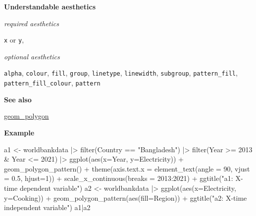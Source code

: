 \documentclass[
  letterpaper,
  DIV=11,
  numbers=noendperiod]{scrreprt}
\newenvironment{Shaded}{\begin{snugshade}}{\end{snugshade}}
\newcommand{\AttributeTok}[1]{\textcolor[rgb]{0.40,0.45,0.13}{#1}}
\newcommand{\DecValTok}[1]{\textcolor[rgb]{0.68,0.00,0.00}{#1}}
\newcommand{\FloatTok}[1]{\textcolor[rgb]{0.68,0.00,0.00}{#1}}
\newcommand{\FunctionTok}[1]{\textcolor[rgb]{0.28,0.35,0.67}{#1}}
\newcommand{\NormalTok}[1]{\textcolor[rgb]{0.00,0.23,0.31}{#1}}
\newcommand{\OtherTok}[1]{\textcolor[rgb]{0.00,0.23,0.31}{#1}}
\newcommand{\SpecialCharTok}[1]{\textcolor[rgb]{0.37,0.37,0.37}{#1}}
\newcommand{\StringTok}[1]{\textcolor[rgb]{0.13,0.47,0.30}{#1}}
\begin{document}
\textbf{Understandable aesthetics}

\emph{required aesthetics}

\texttt{x} or \texttt{y},

\emph{optional aesthetics}

\texttt{alpha}, \texttt{colour}, \texttt{fill}, \texttt{group},
\texttt{linetype}, \texttt{linewidth}, \texttt{subgroup},
\texttt{pattern\_fill}, \texttt{pattern\_fill\_colour}, \texttt{pattern}

\textbf{See also}

\hyperref[polygon]{geom\_polygon}

\textbf{Example}

\begin{Shaded}
\begin{Highlighting}[]
\NormalTok{a1 }\OtherTok{\textless{}{-}}\NormalTok{ worldbankdata }\SpecialCharTok{|\textgreater{}}
  \FunctionTok{filter}\NormalTok{(Country }\SpecialCharTok{==} \StringTok{"Bangladesh"}\NormalTok{) }\SpecialCharTok{|\textgreater{}} 
  \FunctionTok{filter}\NormalTok{(Year }\SpecialCharTok{\textgreater{}=} \DecValTok{2013} \SpecialCharTok{\&}\NormalTok{ Year }\SpecialCharTok{\textless{}=} \DecValTok{2021}\NormalTok{) }\SpecialCharTok{|\textgreater{}}
  \FunctionTok{ggplot}\NormalTok{(}\FunctionTok{aes}\NormalTok{(}\AttributeTok{x=}\NormalTok{Year, }\AttributeTok{y=}\NormalTok{Electricity)) }\SpecialCharTok{+} 
  \FunctionTok{geom\_polygon\_pattern}\NormalTok{() }\SpecialCharTok{+}
  \FunctionTok{theme}\NormalTok{(}\AttributeTok{axis.text.x =} \FunctionTok{element\_text}\NormalTok{(}\AttributeTok{angle =} \DecValTok{90}\NormalTok{, }\AttributeTok{vjust =} \FloatTok{0.5}\NormalTok{, }\AttributeTok{hjust=}\DecValTok{1}\NormalTok{)) }\SpecialCharTok{+} 
  \FunctionTok{scale\_x\_continuous}\NormalTok{(}\AttributeTok{breaks =} \DecValTok{2013}\SpecialCharTok{:}\DecValTok{2021}\NormalTok{)  }\SpecialCharTok{+} 
  \FunctionTok{ggtitle}\NormalTok{(}\StringTok{"a1: X{-}time dependent variable"}\NormalTok{)}
\NormalTok{a2 }\OtherTok{\textless{}{-}}\NormalTok{ worldbankdata }\SpecialCharTok{|\textgreater{}}
  \FunctionTok{ggplot}\NormalTok{(}\FunctionTok{aes}\NormalTok{(}\AttributeTok{x=}\NormalTok{Electricity, }\AttributeTok{y=}\NormalTok{Cooking)) }\SpecialCharTok{+} 
  \FunctionTok{geom\_polygon\_pattern}\NormalTok{(}\FunctionTok{aes}\NormalTok{(}\AttributeTok{fill=}\NormalTok{Region)) }\SpecialCharTok{+} 
  \FunctionTok{ggtitle}\NormalTok{(}\StringTok{"a2: X{-}time independent variable"}\NormalTok{)}
\NormalTok{a1}\SpecialCharTok{|}\NormalTok{a2}
\end{Highlighting}
\end{Shaded}
\end{document}
